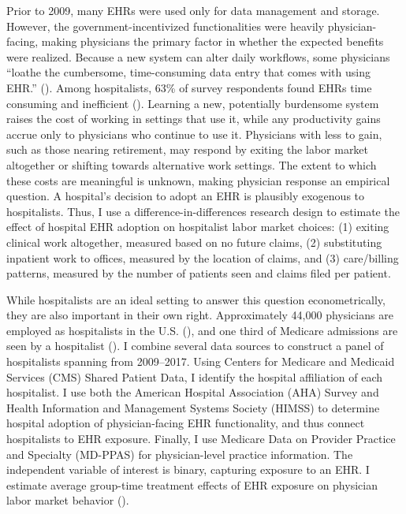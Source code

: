 \documentclass[12pt]{article}
\begin{document}
Prior to 2009, many EHRs were used only for data management and storage. However, the government-incentivized functionalities were heavily physician-facing, making physicians the primary factor in whether the expected benefits were realized. Because a new system can alter daily workflows, some physicians “loathe the cumbersome, time-consuming data entry that comes with using EHR.” (\cite{CollierBurnout}). Among hospitalists, 63\% of survey respondents found EHRs time consuming and inefficient (\cite{czernik2022hospitalist}). Learning a new, potentially burdensome system raises the cost of working in settings that use it, while any productivity gains accrue only to physicians who continue to use it. Physicians with less to gain, such as those nearing retirement, may respond by exiting the labor market altogether or shifting towards alternative work settings. The extent to which these costs are meaningful is unknown, making physician response an empirical question. A hospital's decision to adopt an EHR is plausibly exogenous to hospitalists. Thus, I use a difference-in-differences research design to estimate the effect of hospital EHR adoption on hospitalist labor market choices: (1) exiting clinical work altogether, measured based on no future claims, (2) substituting inpatient work to offices, measured by the location of claims, and (3) care/billing patterns, measured by the number of patients seen and claims filed per patient.

While hospitalists are an ideal setting to answer this question econometrically, they are also important in their own right. Approximately 44,000 physicians are employed as hospitalists in the U.S. (\cite{bls}), and one third of Medicare admissions are seen by a hospitalist (\cite{messler2015history}). I combine several data sources to construct a panel of hospitalists spanning from 2009--2017. Using Centers for Medicare and Medicaid Services (CMS) Shared Patient Data, I identify the hospital affiliation of each hospitalist. I use both the American Hospital Association (AHA) Survey and Health Information and Management Systems Society (HIMSS) to determine hospital adoption of physician-facing EHR functionality, and thus connect hospitalists to EHR exposure. Finally, I use Medicare Data on Provider Practice and Specialty (MD-PPAS) for physician-level practice information. The independent variable of interest is binary, capturing exposure to an EHR. I estimate average group-time treatment effects of EHR exposure on physician labor market behavior (\cite{callaway2021difference}).
\end{document}
